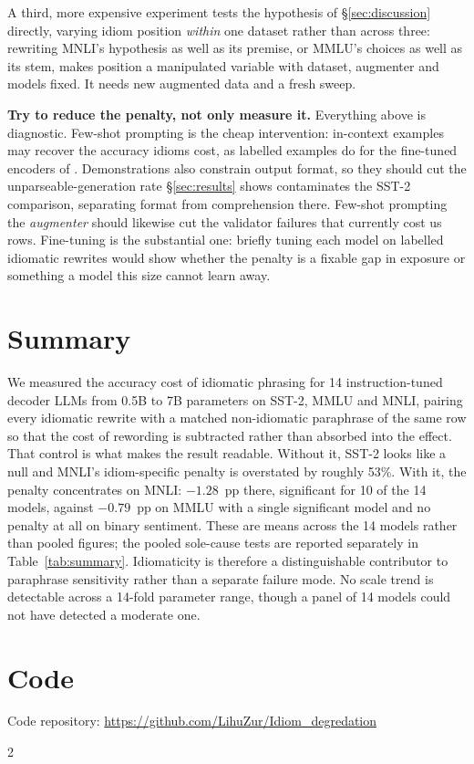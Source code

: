 \documentclass{article}   %
\newcommand{\citetf}[1]{\citet{#1}}
\begin{document}
A third, more expensive experiment tests the hypothesis of
\S\ref{sec:discussion} directly, varying idiom position \emph{within} one
dataset rather than across three: rewriting MNLI's hypothesis as well as its
premise, or MMLU's choices as well as its stem, makes position a manipulated
variable with dataset, augmenter and models fixed. It needs new augmented data
and a fresh sweep.

\textbf{Try to reduce the penalty, not only measure it.} Everything above is
diagnostic. Few-shot prompting is the cheap intervention: in-context examples
may recover the accuracy idioms cost, as labelled examples do for the
fine-tuned encoders of \citetf{tayyar2021astitch}. Demonstrations also
constrain output format, so they should cut the unparseable-generation rate
\S\ref{sec:results} shows contaminates the SST-2 comparison, separating format
from comprehension there. Few-shot prompting the \emph{augmenter} should
likewise cut the validator failures that currently cost us rows. Fine-tuning is
the substantial one: briefly tuning each model on labelled idiomatic rewrites
would show whether the penalty is a fixable gap in exposure or something a
model this size cannot learn away.

\section{Summary}

We measured the accuracy cost of idiomatic phrasing for 14 instruction-tuned
decoder LLMs from 0.5B to 7B parameters on SST-2, MMLU and MNLI, pairing every
idiomatic rewrite with a matched non-idiomatic paraphrase of the same row so
that the cost of rewording is subtracted rather than absorbed into the effect.
That control is what makes the result readable. Without it, SST-2 looks like a
null and MNLI's idiom-specific penalty is overstated by roughly 53\%. With it,
the penalty concentrates on MNLI: $-1.28$~pp there, significant for 10 of the
14 models, against $-0.79$~pp on MMLU with a single significant model and no
penalty at all on binary sentiment. These are means across the 14 models rather
than pooled figures; the pooled sole-cause tests are reported separately in
Table~\ref{tab:summary}. Idiomaticity is therefore a distinguishable
contributor to paraphrase sensitivity rather than a separate failure mode. No
scale trend is detectable across a 14-fold parameter range, though a panel of
14 models could not have detected a moderate one.

\section{Code}

Code repository: \url{https://github.com/LihuZur/Idiom_degredation} %

{\scriptsize\setlength{\bibsep}{1pt}
\setlength{\columnsep}{14pt}
\begin{multicols}{2}
\raggedright   %


\end{multicols}}
\end{document}
